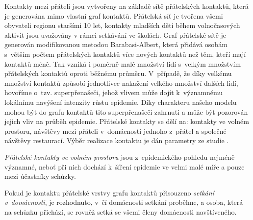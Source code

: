 



Kontakty mezi přáteli jsou vytvořeny na základě sítě přátelských kontaktů, která je generována mimo vlastní graf kontaktů. Přátelská síť je tvořena všemi obyvateli regionu staršími 10 let, kontakty mladších dětí během volnočasových aktivit jsou uvažovány v rámci setkávání ve školách. Graf přátelské sítě je generován modifikovanou metodou Barabasi-Albert, která přidává osobám s~větším počtem přátelských kontaktů více nových kontaktů než těm, kteří mají kontaktů méně. Tak vzniká i poměrně malé množství lidí s~velkým množstvím přátelských kontaktů oproti běžnému průměru. V~případě, že díky velkému množství kontaktů způsobí jednotlivec nakažení velkého množství dalších lidí, hovoříme o~tzv. superpřenašeči, jehož vlivem může dojít k~významnému lokálnímu navýšení intenzity růstu epidemie. Díky charakteru našeho modelu mohou být do grafu kontaktů tito superpřenašeči zahrnuti a může být pozorován jejich vliv na průběh epidemie.
Přátelské kontakty se dělí na: kontakty ve volném prostoru, návštěvy mezi přáteli v~domácnosti jednoho z~přátel a společné návštěvy restaurací. Výběr realizace kontaktu je dán parametry ze studie \cite{zaj:medianlife}.

\emph{Přátelské kontakty ve volném prostoru} jsou z~epidemického pohledu nejméně významné, neboť při nich dochází k~šíření epidemie ve velmi malé míře a pouze mezi účastníky schůzky.

Pokud je kontaktu přátelské vrstvy grafu kontaktů přisouzeno \emph{setkání v~do\-mác\-nos\-ti}, je rozhodnuto, v~čí domácnosti setkání proběhne, a osoba, která na schůzku přichází, se rovněž setká se všemi členy domácnosti navštíveného.

